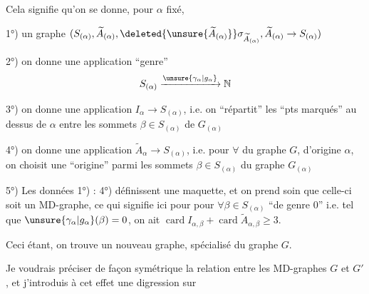Cela signifie qu'on se donne, pour $\alpha$ fixé,

1°) un graphe  $(S_{(\alpha)},\widetilde A_{(\alpha)},\deleted{\unsure{\widetilde A_{(\alpha)}}}\sigma_{\widetilde A_{(\alpha)}},\widetilde A_{(\alpha)}\to S_{(\alpha)})$

2°) on  donne une application ``genre''
\[
S_{(\alpha)}\xrightarrow{\unsure{\gamma_\alpha|g_\alpha}}\mathbb N
\]

3°) on donne une application $I_\alpha\to S_{(\alpha)}$, i.e. on ``répartit'' les  ``pts marqués'' au dessus de $\alpha$  entre les sommets $\beta\in S_{(\alpha)}$ de $G_{(\alpha)}$

4°) on donne une application $\widetilde A_\alpha\to S_{(\alpha)}$, i.e. pour $\forall$  du graphe $G$, d'origine $\alpha$, on  choisit une  ``origine'' parmi les sommets $\beta\in S_{(\alpha)}$ du graphe $G_{(\alpha)}$

5°) Les données 1°) : 4°) définissent une maquette,  et on prend soin que celle-ci soit un MD-graphe,  ce qui signifie ici pour pour $\forall\beta\in S_{(\alpha)}$ ``de genre 0'' i.e. tel que $\unsure{\gamma_\alpha|g_\alpha}(\beta)=0$, on ait $\operatorname{card}I_{\alpha,\beta}+\operatorname{card}\widetilde A_{\alpha,\beta}\geq 3$.

Ceci étant, on trouve un nouveau graphe,  spécialisé du graphe $G$.

Je voudrais préciser de façon symétrique la relation entre les MD-graphes $G$ et $G'$, et j'introduis à cet effet une digression sur
